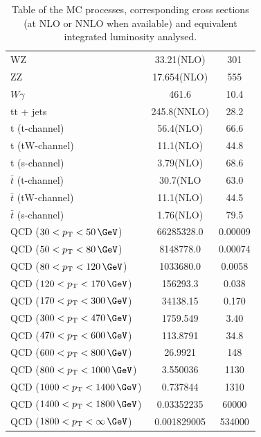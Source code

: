 \begin{table}
{\begin{tabular}{|l|c|c|}
WZ                                                          & 33.21(NLO)    &     301 \\
ZZ                                                          & 17.654(NLO)   &     555 \\
$W \gamma$                                                  & 461.6         &    10.4 \\
tt + jets                                                   & 245.8(NNLO)   &    28.2 \\
t (t-channel)                                               & 56.4(NLO)     &    66.6 \\
t (tW-channel)                                              & 11.1(NLO)     &    44.8 \\
t (s-channel)                                               & 3.79(NLO)     &    68.6 \\
$\bar{t}$ (t-channel)                                       & 30.7(NLO      &    63.0 \\
$\bar{t}$ (tW-channel)                                      & 11.1(NLO)     &    44.5 \\
$\bar{t}$ (s-channel)                                       & 1.76(NLO)     &    79.5 \\
QCD ($30  <\pt<50    \,\GeV$)                               & 66285328.0    & 0.00009 \\
QCD ($50  <\pt<80    \,\GeV$)                               & 8148778.0     & 0.00074 \\
QCD ($80  <\pt<120   \,\GeV$)                               & 1033680.0     &  0.0058 \\
QCD ($120 <\pt<170   \,\GeV$)                               & 156293.3      &   0.038 \\
QCD ($170 <\pt<300   \,\GeV$)                               & 34138.15      &   0.170 \\
QCD ($300 <\pt<470   \,\GeV$)                               & 1759.549      &    3.40 \\
QCD ($470 <\pt<600   \,\GeV$)                               & 113.8791      &    34.8 \\
QCD ($600 <\pt<800   \,\GeV$)                               & 26.9921       &     148 \\
QCD ($800 <\pt<1000  \,\GeV$)                               & 3.550036      &    1130 \\
QCD ($1000<\pt<1400  \,\GeV$)                               & 0.737844      &    1310 \\
QCD ($1400<\pt<1800  \,\GeV$)                               & 0.03352235    &   60000 \\
QCD ($1800<\pt<\infty\,\GeV$)                               & 0.001829005   &  534000 \\
\hline
\end{tabular}
}
\caption{Table of the \gls{MC} processes, corresponding cross sections (at NLO or NNLO when available) and equivalent integrated luminosity analysed.}
\label{TABLE:ParkedDataAnalysis}
\end{table}

